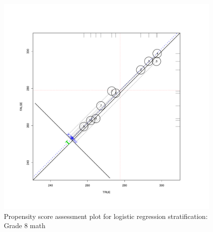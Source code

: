 \begin{figure}[h!]
\begin{center}
\includegraphics[height=.4\textheight,width=.4\textheight]{../Figures2009/g8math-circpsa10.pdf}
\caption{Propensity score assessment plot for logistic regression stratification: Grade 8 math}
\end{center}
\end{figure}



